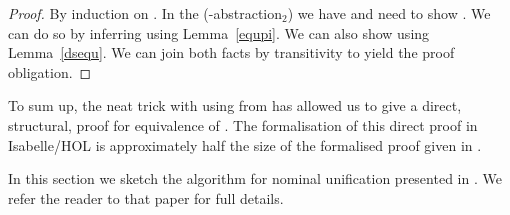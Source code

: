 \begin{isabellebody}
\begin{isamarkuptext}
  \begin{proof}
  By induction on . In the (-abstraction$_2$) we 
  have  and need to show . We can 
  do so by inferring  using Lemma~\ref{equpi}.
  We can also show  using Lemma~\ref{dsequ}. 
  We can join both facts by transitivity to yield the proof obligation.
  \end{proof}

  \noindent
  To sum up, the neat trick with using  from \cite{KumarNorrish10} has allowed us
  to give a direct, structural,  proof for equivalence of . The formalisation of this
  direct proof in Isabelle/HOL is approximately half the size of the formalised proof given 
  in \cite{UrbanPittsGabbay04}.\end{isamarkuptext}\isamarkuptrue {}
\isamarkuptrue \begin{isamarkuptext}In this section we sketch the algorithm for nominal unification presented in \cite{UrbanPittsGabbay04}. 
  We refer the reader to that paper for full details.


\end{isamarkuptext}
\end{isabellebody}
